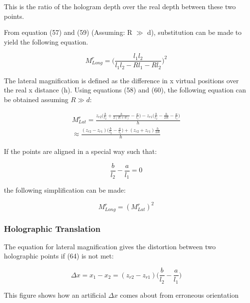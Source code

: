 \documentclass[12pt]{article}
\begin{document}
This is the ratio of the hologram depth over the real depth between these two points.

From equation (57) and (59) (Assuming: R \(\gg\) d), substitution can be made to yield the following equation.

\begin{equation}
	M_{Long}^r = \bigg(\frac{l_{1}l_{2}}{l_{1}l_{2} - Rl_{1} - Rl_{2}}\bigg)^2
\end{equation}

The lateral magnification is defined as the difference in x virtual positions over the real x distance (h). Using equations (58) and (60), the following equation can be obtained assuming \(R \gg d\):

\begin{equation}
	\begin{multlined}
		M_{Lat}^r = \frac{z_{r2}\bigg( \frac{b}{l_{2}} + \frac{h}{2(R + d)} - \frac{a}{l_{1}}\bigg) - z_{r1}\bigg(\frac{b}{l_{2}} - \frac{h}{2R} - \frac{a}{l_{1}} \bigg)}{h}
		\\\approx \frac{(z_{r2} - z_{r1})\bigg(\frac{b}{l_{2}} -\frac{a}{l_{1}} \bigg) + (z_{r2} + z_{r1})\frac{h}{2R}}{h}
	\end{multlined}
\end{equation}

If the points are aligned in a special way such that:

\begin{equation}
	\frac{b}{l_{2}} - \frac{a}{l_{1}} = 0
\end{equation}

the following simplification can be made:

\begin{equation}
	M_{Long}^r = (M_{Lat}^r)^2
\end{equation}

\subsubsection{Holographic Translation}

The equation for lateral magnification gives the distortion between two holographic points if (64) is not met:

\begin{equation}
	\Delta x = x_{1} - x_{2} = (z_{r2} - z_{r1})\bigg(\frac{b}{l_{2}} - \frac{a}{l_{1}}\bigg)
\end{equation}

This figure shows how an artificial \(\Delta x\) comes about from erroneous orientation
\end{document}
